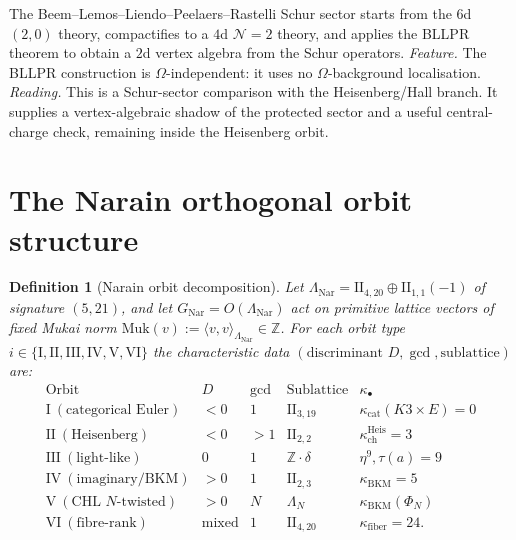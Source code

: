 \documentclass[11pt]{article}
\newtheorem{definition}[theorem]{Definition}
\begin{document}
The Beem--Lemos--Liendo--Peelaers--Rastelli
Schur sector starts from the $6$d $(2,0)$ theory, compactifies to a
$4$d $\mathcal N = 2$ theory, and applies the BLLPR theorem to
obtain a $2$d vertex algebra from the Schur operators.
\emph{Feature.} The BLLPR construction is $\Omega$-independent:
it uses no $\Omega$-background localisation.
\emph{Reading.} This is a Schur-sector comparison with the
Heisenberg/Hall branch. It supplies a vertex-algebraic shadow of the
protected sector and a useful central-charge check, remaining inside
the Heisenberg orbit.

\section{The Narain orthogonal orbit structure}
\label{sec:orbits}

\begin{definition}[Narain orbit decomposition]
\label{def:narain-orbits}
Let $\Lambda_{\mathrm{Nar}} = \mathrm{II}_{4,20} \oplus
\mathrm{II}_{1,1}(-1)$ of signature $(5, 21)$, and let
$G_{\mathrm{Nar}} = O(\Lambda_{\mathrm{Nar}})$ act on
primitive lattice vectors of fixed Mukai norm
$\mathrm{Muk}(v) := \langle v, v \rangle_{\Lambda_{\mathrm{Nar}}}
\in \mathbb Z$.
For each orbit type $i \in \{\mathrm I, \mathrm{II}, \mathrm{III},
\mathrm{IV}, \mathrm V, \mathrm{VI}\}$ the characteristic data
$(\text{discriminant } D, \gcd, \text{sublattice})$ are:
\[
\begin{array}{lcccl}
\text{Orbit} & D & \gcd & \text{Sublattice} & \kappa_\bullet \\
\hline
\mathrm I \ (\text{categorical Euler}) & <0 & 1 & \mathrm{II}_{3,19} & \kappa_{\mathrm{cat}}(K3\times E) = 0 \\
\mathrm{II} \ (\text{Heisenberg}) & <0 & >1 & \mathrm{II}_{2,2} & \kappa_{\mathrm{ch}}^{\mathrm{Heis}} = 3 \\
\mathrm{III} \ (\text{light-like}) & 0 & 1 & \mathbb Z \cdot \delta & \eta^9, \tau(a) = 9 \\
\mathrm{IV} \ (\text{imaginary/BKM}) & >0 & 1 & \mathrm{II}_{2,3} & \kappa_{\mathrm{BKM}} = 5 \\
\mathrm V \ (\text{CHL }N\text{-twisted}) & >0 & N & \Lambda_N & \kappa_{\mathrm{BKM}}(\Phi_N) \\
\mathrm{VI} \ (\text{fibre-rank}) & \text{mixed} & 1 & \mathrm{II}_{4,20} & \kappa_{\mathrm{fiber}} = 24.
\end{array}
\]
\end{definition}
\end{document}
